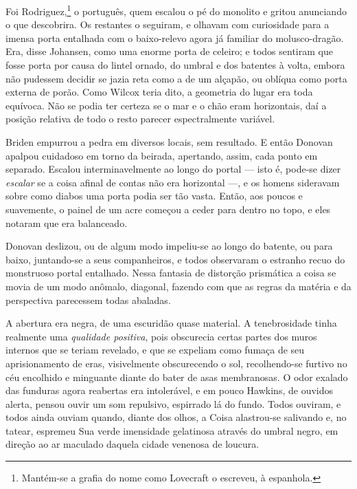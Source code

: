 Foi Rodriguez,\footnote{Mantém-se a grafia do nome como Lovecraft o
  escreveu, à espanhola.} o português, quem escalou o pé do monolito e
gritou anunciando o que descobrira. Os restantes o seguiram, e olhavam
com curiosidade para a imensa porta entalhada com o baixo-relevo agora
já familiar do molusco-dragão. Era, disse Johansen, como uma enorme
porta de celeiro; e todos sentiram que fosse porta por causa do lintel
ornado, do umbral e dos batentes à volta, embora não pudessem decidir se
jazia reta como a de um alçapão, ou oblíqua como porta externa de porão.
Como Wilcox teria dito, a geometria do lugar era toda equívoca. Não se
podia ter certeza se o mar e o chão eram horizontais, daí a posição
relativa de todo o resto parecer espectralmente variável.

Briden empurrou a pedra em diversos locais, sem resultado. E então
Donovan apalpou cuidadoso em torno da beirada, apertando, assim, cada
ponto em separado. Escalou interminavelmente ao longo do portal --- isto
é, pode-se dizer \emph{escalar} se a coisa afinal de contas não era
horizontal ---, e os homens sideravam sobre como diabos uma porta podia
ser tão vasta. Então, aos poucos e suavemente, o painel de um acre
começou a ceder para dentro no topo, e eles notaram que era balanceado.

Donovan deslizou, ou de algum modo impeliu-se ao longo do batente, ou
para baixo, juntando-se a seus companheiros, e todos observaram o
estranho recuo do monstruoso portal entalhado. Nessa fantasia de
distorção prismática a coisa se movia de um modo anômalo, diagonal,
fazendo com que as regras da matéria e da perspectiva parecessem todas
abaladas.

A abertura era negra, de uma escuridão quase material. A tenebrosidade
tinha realmente uma \emph{qualidade positiva}, pois obscurecia certas
partes dos muros internos que se teriam revelado, e que se expeliam como
fumaça de seu aprisionamento de eras, visivelmente obscurecendo o sol,
recolhendo-se furtivo no céu encolhido e minguante diante do bater de
asas membranosas. O odor exalado das funduras agora reabertas era
intolerável, e em pouco Hawkins, de ouvidos alerta, pensou ouvir um som
repulsivo, espirrado lá do fundo. Todos ouviram, e todos ainda ouviam
quando, diante dos olhos, a Coisa alastrou-se salivando e, no tatear,
espremeu Sua verde imensidade gelatinosa através do umbral negro, em
direção ao ar maculado daquela cidade venenosa de loucura.

